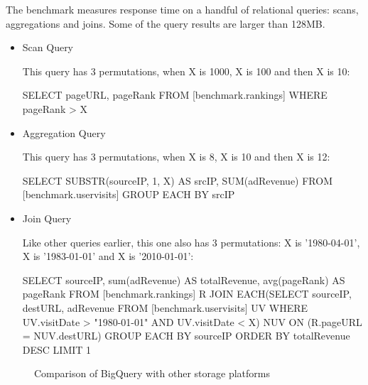 \documentclass[9pt,twocolumn,twoside]{../../styles/osajnl}
\begin{document}
\noindent
The benchmark measures response time on a handful of relational
queries: scans, aggregations and joins. Some of the query results are
larger than 128MB.
\begin{itemize}
\item Scan Query

This query has 3 permutations, when X is 1000, X is 100 and then X is 10:

SELECT pageURL, pageRank FROM [benchmark.rankings] WHERE pageRank > X


\item Aggregation Query

This query has 3 permutations, when X is 8, X is 10 and then X is 12:

SELECT SUBSTR(sourceIP, 1, X) AS srcIP, SUM(adRevenue)
FROM [benchmark.uservisits]
GROUP EACH BY srcIP


\item Join Query

Like other queries earlier, this one also has 3 permutations: X is ’1980-04-01’, X is ’1983-01-01’ and X is ’2010-01-01’:

SELECT sourceIP, sum(adRevenue) AS totalRevenue, avg(pageRank) AS pageRank
FROM [benchmark.rankings] R
JOIN EACH(SELECT sourceIP, destURL, adRevenue
FROM [benchmark.uservisits] UV WHERE UV.visitDate > "1980-01-01" AND UV.visitDate < X)
NUV ON (R.pageURL = NUV.destURL)
GROUP EACH BY sourceIP
ORDER BY totalRevenue DESC LIMIT 1
\end{itemize}

\begin{figure}[htbp]
\centering
{}
\caption{\cite{www-benchmarks-bigguery} Comparison of BigQuery with other storage platforms}
\label{fig:experiments}
\end{figure}
\end{document}
